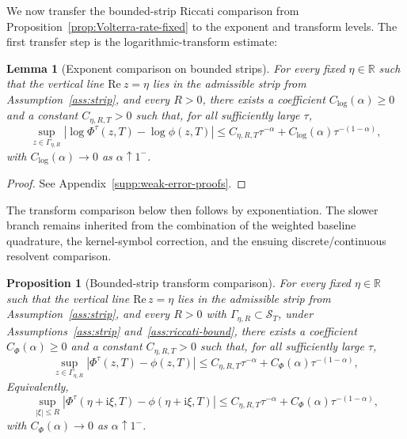 \documentclass[letterpaper]{article}
\numberwithin{equation}{section}
\newtheorem{lemma}[theorem]{Lemma}
\newtheorem{proposition}[theorem]{Proposition}
\theoremstyle{definition}
\theoremstyle{remark}
\newcommand{\R}{\mathbb{R}}
\newcommand{\ii}{\mathrm{i}}
\begin{document}
We now transfer the bounded-strip Riccati comparison from
Proposition~\ref{prop:Volterra-rate-fixed} to the exponent and transform levels.
The first transfer step is the logarithmic-transform estimate:

\begin{lemma}[Exponent comparison on bounded strips]
\label{lem:exponent-comparison}
For every fixed $\eta\in\R$ such that the vertical line $\mathrm{Re}\ z=\eta$ lies in
the admissible strip from Assumption~\ref{ass:strip}, and every $R>0$, there
exists a coefficient $C_{\log}(\alpha)\ge0$ and a constant $C_{\eta,R,T}>0$
such that, for all sufficiently large $\tau$,
\begin{equation}\label{eq:log-transform-bound}
  \sup_{z\in\Gamma_{\eta,R}}
  |\log\Phi^\tau(z,T)-\log\phi(z,T)|
  \le
  C_{\eta,R,T}\tau^{-\alpha}
  +
  C_{\log}(\alpha)\tau^{-(1-\alpha)},
\end{equation}
with $C_{\log}(\alpha)\to0$ as $\alpha\uparrow1^-$.
\end{lemma}

\begin{proof}
See Appendix~\ref{supp:weak-error-proofs}.
\end{proof}

The transform comparison below then follows by exponentiation. The slower
branch remains inherited from the combination of the weighted baseline
quadrature, the kernel-symbol correction, and the ensuing
discrete/continuous resolvent comparison.

\begin{proposition}[Bounded-strip transform comparison]
\label{prop:transform-bound-fixed}
{For every fixed $\eta\in\R$ such that the vertical line $\mathrm{Re}\,z=\eta$ lies in the admissible strip from Assumption~\ref{ass:strip}, and every $R>0$ with $\Gamma_{\eta,R}\subset\mathcal S_T$, under Assumptions~\ref{ass:strip} and~\ref{ass:riccati-bound},} there exists a coefficient $C_{\Phi}(\alpha)\ge0$ and a constant $C_{\eta,R,T}>0$ such that, for all sufficiently large
$\tau$,
\begin{equation}\label{eq:transform-bound-fixed}
  \sup_{z\in\Gamma_{\eta,R}}
  \left|
    \Phi^\tau(z,T)-\phi(z,T)
  \right|
  \le
  C_{\eta,R,T}\tau^{-\alpha}+C_{\Phi}(\alpha)\tau^{-(1-\alpha)},
\end{equation}
Equivalently,
\begin{equation}\label{eq:transform-bound-xi}
  \sup_{|\xi|\le R}
  \left|
    \Phi^\tau(\eta+\ii \xi,T)-\phi(\eta+\ii \xi,T)
  \right|
  \le
  C_{\eta,R,T}\tau^{-\alpha}+C_{\Phi}(\alpha)\tau^{-(1-\alpha)},
\end{equation}
with $C_{\Phi}(\alpha)\to0$ as $\alpha\uparrow1^-$.
\end{proposition}
\end{document}

